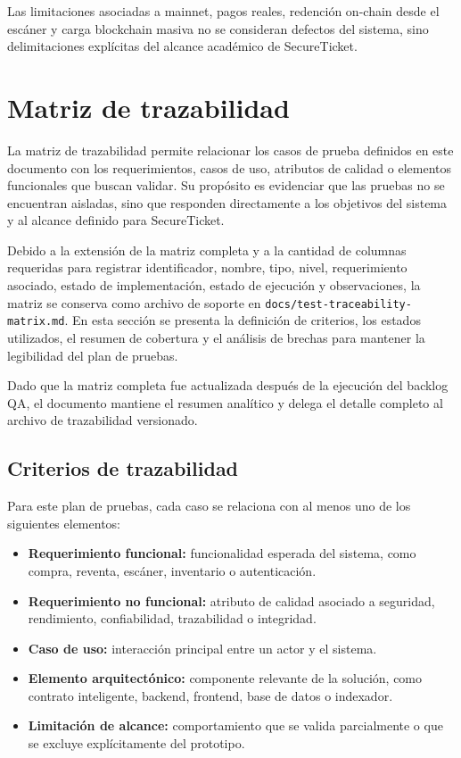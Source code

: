 \documentclass[12pt,letterpaper]{article}
\newcommand{\NombreProyecto}{SecureTicket}
\begin{document}
Las limitaciones asociadas a mainnet, pagos reales, redención on-chain desde el escáner y carga blockchain masiva no se consideran defectos del sistema, sino delimitaciones explícitas del alcance académico de \NombreProyecto{}.


\section{Matriz de trazabilidad}

La matriz de trazabilidad permite relacionar los casos de prueba definidos en este documento con los requerimientos, casos de uso, atributos de calidad o elementos funcionales que buscan validar. Su propósito es evidenciar que las pruebas no se encuentran aisladas, sino que responden directamente a los objetivos del sistema y al alcance definido para \NombreProyecto{}.

Debido a la extensión de la matriz completa y a la cantidad de columnas requeridas para registrar identificador, nombre, tipo, nivel, requerimiento asociado, estado de implementación, estado de ejecución y observaciones, la matriz se conserva como archivo de soporte en \texttt{docs/test-traceability-matrix.md}. En esta sección se presenta la definición de criterios, los estados utilizados, el resumen de cobertura y el análisis de brechas para mantener la legibilidad del plan de pruebas.

Dado que la matriz completa fue actualizada después de la ejecución del backlog QA, el documento mantiene el resumen analítico y delega el detalle completo al archivo de trazabilidad versionado.

\subsection{Criterios de trazabilidad}

Para este plan de pruebas, cada caso se relaciona con al menos uno de los siguientes elementos:

\begin{itemize}
    \item \textbf{Requerimiento funcional:} funcionalidad esperada del sistema, como compra, reventa, escáner, inventario o autenticación.
    \item \textbf{Requerimiento no funcional:} atributo de calidad asociado a seguridad, rendimiento, confiabilidad, trazabilidad o integridad.
    \item \textbf{Caso de uso:} interacción principal entre un actor y el sistema.
    \item \textbf{Elemento arquitectónico:} componente relevante de la solución, como contrato inteligente, backend, frontend, base de datos o indexador.
    \item \textbf{Limitación de alcance:} comportamiento que se valida parcialmente o que se excluye explícitamente del prototipo.
\end{itemize}
\end{document}
